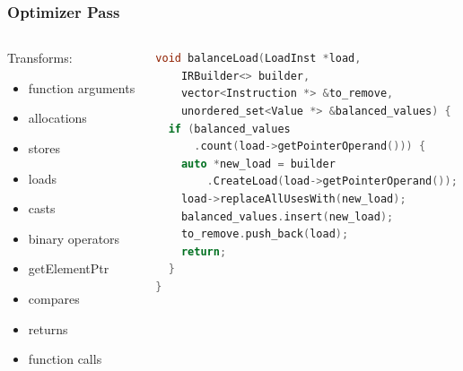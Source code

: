 \documentclass[11pt,t,usepdftitle=false,aspectratio=169]{beamer}
\begin{document}
\begin{frame}[fragile]
  \frametitle{Optimizer Pass}

  \begin{columns}[T]
    \begin{column}{0.3\textwidth}
      Transforms:
      \begin{itemize}
      \item function arguments
      \item allocations
      \item stores
      \item loads \quad {}
      \item casts
      \item binary operators
      \item getElementPtr
      \item compares
      \item returns
      \item function calls
      \end{itemize}
    \end{column}
    \hfill
    \pause
    \vrule
    \hfill
    \begin{column}{0.6\textwidth}
      \begin{lstlisting}[language=C++,basicstyle=\small]
void balanceLoad(LoadInst *load,
    IRBuilder<> builder,
    vector<Instruction *> &to_remove,
    unordered_set<Value *> &balanced_values) {
  if (balanced_values
      .count(load->getPointerOperand())) {
    auto *new_load = builder
        .CreateLoad(load->getPointerOperand());
    load->replaceAllUsesWith(new_load);
    balanced_values.insert(new_load);
    to_remove.push_back(load);
    return;
  }
}
      \end{lstlisting}
    \end{column}
  \end{columns}
\end{frame}
\end{document}
